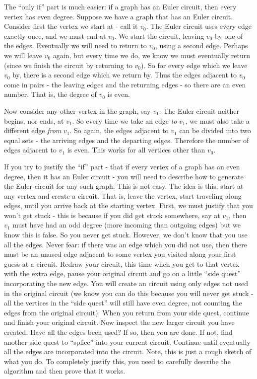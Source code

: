 \documentclass[11pt]{exam}
\begin{document}
\begin{questions}
\begin{solution}
 The ``only if'' part is much easier: if a graph has an Euler circuit, then every vertex has even degree.  Suppose we have a graph that has an Euler circuit.  Consider first the vertex we start at - call it $v_0$.  The Euler circuit uses every edge exactly once, and we must end at $v_0$.  We start the circuit, leaving $v_0$ by one of the edges.  Eventually we will need to return to $v_0$, using a second edge.  Perhaps we will leave $v_0$ again, but every time we do, we know we must eventually return (since we finish the circuit by returning to $v_0$).  So for every edge which we leave $v_0$ by, there is a second edge which we return by.  Thus the edges adjacent to $v_0$ come in pairs - the leaving edges and the returning edges - so there are an even number.  That is, the degree of $v_0$ is even.
 
 Now consider any other vertex in the graph, say $v_1$.  The Euler circuit neither begins, nor ends, at $v_1$.  So every time we take an edge {\em to} $v_1$, we must also take a different edge {\em from} $v_1$.  So again, the edges adjacent to $v_1$ can be divided into two equal sets - the arriving edges and the departing edges.  Therefore the number of edges adjacent to $v_1$ is even.  This works for all vertices other than $v_0$.  
 
 If you try to justify the ``if'' part - that if every vertex of a graph has an even degree, then it has an Euler circuit - you will need to describe how to generate the Euler circuit for any such graph.  This is not easy.  The idea is this: start at any vertex and create a circuit.  That is, leave the vertex, start traveling along edges, until you arrive back at the starting vertex.  First, we must justify that you won't get stuck - this is because if you did get stuck somewhere, say at $v_1$, then $v_1$ must have had an odd degree (more incoming than outgoing edges) but we know this is false.  So you never get stuck.  However, we don't know that you use all the edges.  Never fear: if there was an edge which you did not use, then there must be an unused edge adjacent to some vertex you visited along your first guess at a circuit.  Redraw your circuit, this time when you get to that vertex with the extra edge, pause your original circuit and go on a little ``side quest'' incorporating the new edge.  You will create an circuit using only edges not used in the original circuit (we know you can do this because you will never get stuck - all the vertices in the ``side quest'' will still have even degree, not counting the edges from the original circuit).  When you return from your side quest, continue and finish your original circuit.  Now inspect the new larger circuit you have created.  Have all the edges been used?  If so, then you are done.  If not, find another side quest to ``splice'' into your current circuit.  Continue until eventually all the edges are incorporated into the circuit.  Note, this is just a rough sketch of what you do.  To completely justify this, you need to carefully describe the algorithm and then prove that it works. 
\end{solution}

\end{questions}
\end{document}

